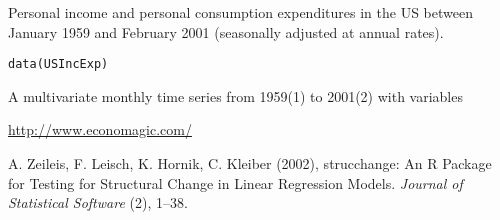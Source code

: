 \begin{Description}\relax
Personal income and personal
consumption expenditures in the US between January 1959 and
February 2001 (seasonally adjusted at annual rates).\end{Description}
\begin{Usage}
\begin{verbatim}data(USIncExp)\end{verbatim}
\end{Usage}
\begin{Format}\relax
A multivariate monthly time series from 1959(1) to 2001(2) with variables
\end{Format}
\begin{Source}\relax
\url{http://www.economagic.com/}\end{Source}
\begin{References}\relax
A. Zeileis, F. Leisch, K. Hornik, C. Kleiber (2002),
strucchange: An R Package for Testing for Structural Change in Linear
Regression Models.
\emph{Journal of Statistical Software} (2), 1--38.\end{References}
